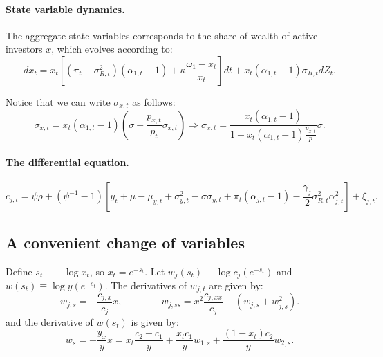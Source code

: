 \documentclass[11pt,english]{article}
\begin{document}
\paragraph{State variable dynamics.} The aggregate state variables corresponds to the share of wealth of active investors $x$, which evolves according to: 
\begin{equation}
d x_t = x_t \left[  (\pi_t-\sigma_{R,t}^2) (\alpha_{1,t}  -1)+ \kappa \frac{\omega_1 - x_t}{x_t} \right]dt + x_t (\alpha_{1,t}-1) \sigma_{R,t} dZ_t.
\end{equation}

Notice that we can write $\sigma_{x,t}$ as follows:
\begin{equation}
    \sigma_{x,t} = x_t (\alpha_{1,t}-1) \left(\sigma+\frac{p_{x,t}}{p_t} \sigma_{x,t}\right) \Rightarrow \sigma_{x,t} = \frac{x_t (\alpha_{1,t} -1)}{1- x_t (\alpha_{1,t}-1) \frac{p_{x,t}}{p}} \sigma.
\end{equation}


\paragraph{The differential equation.}

\begin{equation}
c_{j,t} = \psi \rho + (\psi^{-1}-1) \left[y_t +\mu-\mu_{y,t} + \sigma_{y,t}^2- \sigma \sigma_{y,t} + \pi_t (\alpha_{j,t}-1) - \frac{\gamma_j}{2} \sigma_{R,t}^2 \alpha_{j,t}^2 \right] + \xi_{j,t}.
\end{equation}

\subsection{A convenient change of variables}

Define $s_t \equiv - \log x_t$, so $x_t = e^{-s_t}$. Let $w_{j}(s_t) \equiv \log c_{j}(e^{-s_t})$ and $w(s_t) \equiv \log y(e^{-s_t})$. The derivatives of $w_{j,t}$ are given by:
\begin{equation}
    w_{j,s} = -\frac{c_{j,x}}{c_{j}} x, \qquad \qquad w_{j,ss} = x^2 \frac{c_{j,xx}}{c_{j}} - (w_{j,s} + w_{j,s}^2).
\end{equation}
and the derivative of $w(s_t)$ is given by:
\begin{equation}
    w_{s} = -\frac{y_{x}}{y} x = x_t \frac{c_{2} - c_{1}}{y} + \frac{x_t c_{1}}{y} w_{1,s} + \frac{(1-x_t) c_{2}}{y} w_{2,s}.
\end{equation}
\end{document}
